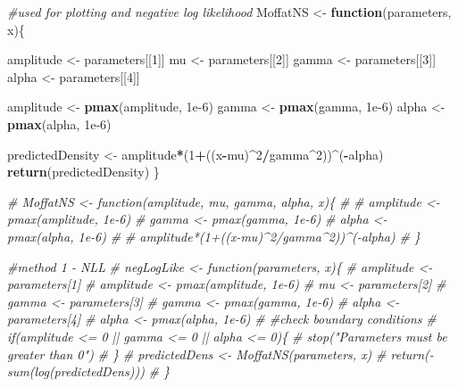 \documentclass[
]{article}
\newenvironment{Shaded}{\begin{snugshade}}{\end{snugshade}}
\newcommand{\CommentTok}[1]{\textcolor[rgb]{0.56,0.35,0.01}{\textit{#1}}}
\newcommand{\ControlFlowTok}[1]{\textcolor[rgb]{0.13,0.29,0.53}{\textbf{#1}}}
\newcommand{\DecValTok}[1]{\textcolor[rgb]{0.00,0.00,0.81}{#1}}
\newcommand{\FloatTok}[1]{\textcolor[rgb]{0.00,0.00,0.81}{#1}}
\newcommand{\FunctionTok}[1]{\textcolor[rgb]{0.13,0.29,0.53}{\textbf{#1}}}
\newcommand{\NormalTok}[1]{#1}
\newcommand{\OtherTok}[1]{\textcolor[rgb]{0.56,0.35,0.01}{#1}}
\newcommand{\SpecialCharTok}[1]{\textcolor[rgb]{0.81,0.36,0.00}{\textbf{#1}}}
\begin{document}
\begin{Shaded}
\begin{Highlighting}[]
\CommentTok{\#used for plotting and negative log likelihood}
\NormalTok{MoffatNS }\OtherTok{\textless{}{-}} \ControlFlowTok{function}\NormalTok{(parameters, x)\{}

\NormalTok{  amplitude }\OtherTok{\textless{}{-}}\NormalTok{ parameters[[}\DecValTok{1}\NormalTok{]]}
\NormalTok{  mu }\OtherTok{\textless{}{-}}\NormalTok{ parameters[[}\DecValTok{2}\NormalTok{]]}
\NormalTok{  gamma }\OtherTok{\textless{}{-}}\NormalTok{ parameters[[}\DecValTok{3}\NormalTok{]]}
\NormalTok{  alpha }\OtherTok{\textless{}{-}}\NormalTok{ parameters[[}\DecValTok{4}\NormalTok{]]}

\NormalTok{  amplitude }\OtherTok{\textless{}{-}} \FunctionTok{pmax}\NormalTok{(amplitude, }\FloatTok{1e{-}6}\NormalTok{)}
\NormalTok{  gamma }\OtherTok{\textless{}{-}} \FunctionTok{pmax}\NormalTok{(gamma, }\FloatTok{1e{-}6}\NormalTok{)}
\NormalTok{  alpha }\OtherTok{\textless{}{-}} \FunctionTok{pmax}\NormalTok{(alpha, }\FloatTok{1e{-}6}\NormalTok{)}

\NormalTok{  predictedDensity }\OtherTok{\textless{}{-}}\NormalTok{ amplitude}\SpecialCharTok{*}\NormalTok{(}\DecValTok{1}\SpecialCharTok{+}\NormalTok{((x}\SpecialCharTok{{-}}\NormalTok{mu)}\SpecialCharTok{\^{}}\DecValTok{2}\SpecialCharTok{/}\NormalTok{gamma}\SpecialCharTok{\^{}}\DecValTok{2}\NormalTok{))}\SpecialCharTok{\^{}}\NormalTok{(}\SpecialCharTok{{-}}\NormalTok{alpha)}
  \FunctionTok{return}\NormalTok{(predictedDensity)}
\NormalTok{\}}

\CommentTok{\# MoffatNS \textless{}{-} function(amplitude, mu, gamma, alpha, x)\{}
\CommentTok{\#   }
\CommentTok{\#   amplitude \textless{}{-} pmax(amplitude, 1e{-}6)}
\CommentTok{\#   gamma \textless{}{-} pmax(gamma, 1e{-}6)}
\CommentTok{\#   alpha \textless{}{-} pmax(alpha, 1e{-}6)}
\CommentTok{\#   }
\CommentTok{\#   amplitude*(1+((x{-}mu)\^{}2/gamma\^{}2))\^{}({-}alpha)}
\CommentTok{\# \}}

\CommentTok{\#method 1 {-} NLL}
\CommentTok{\# negLogLike \textless{}{-} function(parameters, x)\{}
\CommentTok{\#   amplitude \textless{}{-} parameters[1]}
\CommentTok{\#     amplitude \textless{}{-} pmax(amplitude, 1e{-}6)}
\CommentTok{\#   mu \textless{}{-} parameters[2]}
\CommentTok{\#   gamma \textless{}{-} parameters[3]}
\CommentTok{\#     gamma \textless{}{-} pmax(gamma, 1e{-}6)}
\CommentTok{\#   alpha \textless{}{-} parameters[4]}
\CommentTok{\#     alpha \textless{}{-} pmax(alpha, 1e{-}6)}
\CommentTok{\#     \#check boundary conditions}
\CommentTok{\#   if(amplitude \textless{}= 0 || gamma \textless{}= 0 || alpha \textless{}= 0)\{}
\CommentTok{\#     stop("Parameters must be greater than 0")}
\CommentTok{\#   \}}
\CommentTok{\#   predictedDens \textless{}{-} MoffatNS(parameters, x)}
\CommentTok{\#   return({-}sum(log(predictedDens)))}
\CommentTok{\# \}}


\end{Highlighting}
\end{Shaded}
\end{document}
